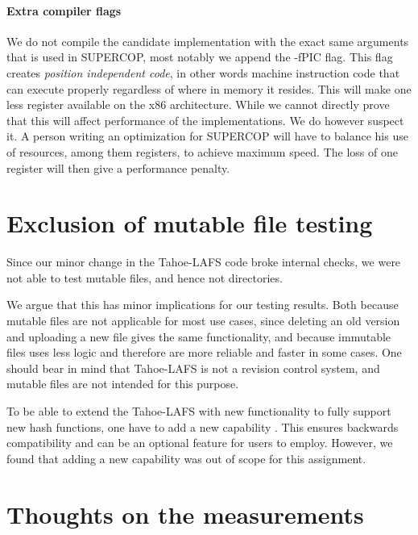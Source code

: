 \documentclass[english,12pt,a4paper]{book}
\begin{document}
\paragraph{Extra compiler flags}
We do not compile the candidate implementation with the exact same arguments
that is used in \ac{SUPERCOP}, most notably we append the -fPIC flag. This flag
creates \emph{position independent code}, in other words machine instruction
code that can execute properly regardless of where in memory it resides. This
will make one less register available on the x86 architecture. While we cannot
directly prove that this will affect performance of the implementations. We do
however suspect it. A person writing an optimization for \ac{SUPERCOP} will have
to balance his use of resources, among them registers, to achieve maximum speed.
The loss of one register will then give a performance penalty.

\section{Exclusion of mutable file testing}

Since our minor change in the Tahoe-\ac{LAFS} code broke internal checks, we
were not able to test mutable files, and hence not directories.

We argue that this has minor implications for our testing results. Both because
mutable files are not applicable for most use cases, since deleting an old
version and uploading a new file gives the same functionality, and because
immutable files uses less logic and therefore are more reliable and faster in
some cases. One should bear in mind that Tahoe-\ac{LAFS} is not a revision
control system, and mutable files are not intended for this purpose.

To be able to extend the Tahoe-LAFS with new functionality to fully support new
hash functions, one have to add a new capability \cite{t_zooko}. This ensures
backwards compatibility and can be an optional feature for users to employ.
However, we found that adding a new capability was out of scope for this
assignment.

\section{Thoughts on the measurements}
\end{document}
